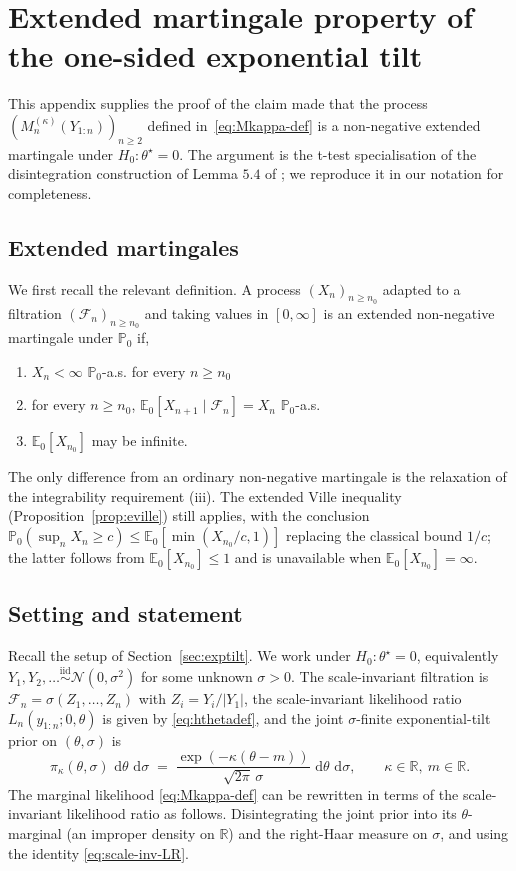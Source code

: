 \documentclass[12pt, a4paper]{report}
\newcommand{\E}{\mathbb{E}}
\newcommand{\dd}{\,\mathrm{d}}
\newcommand{\1}{\mathbf{1}}
\begin{document}
\section{Extended martingale property of the one-sided exponential tilt}
\label{app:extended-mg}
This appendix supplies the proof of the claim made that the process \((M_n^{(\kappa)}(Y_{1:n}))_{n\geq 2}\) defined in~\eqref{eq:Mkappa-def} is a non-negative extended martingale under \(H_0:\theta^\star=0\). The
argument is the t-test specialisation of the disintegration construction of Lemma $5.4$ of \cite{Wang2025}; we reproduce it in our notation for completeness.

\subsection{Extended martingales}

We first recall the relevant definition. A process \((X_n)_{n\geq n_0}\)
adapted to a filtration \((\mathcal{F}_n)_{n\geq n_0}\) and taking values
in \([0,\infty]\) is an extended non-negative martingale under
\(\mathbb{P}_0\) if,
\begin{enumerate}
\item[(i)] \(X_n<\infty\) \(\mathbb{P}_0\)-a.s. for every \(n\geq n_0\)
\item[(ii)] for every \(n\geq n_0\),
\(\E_0[X_{n+1}\mid \mathcal{F}_n]=X_n\) \(\mathbb{P}_0\)-a.s.
\item[(iii)] \(\E_0[X_{n_0}]\) may be infinite.
\end{enumerate}
The only difference from an ordinary non-negative martingale is the
relaxation of the integrability requirement (iii). The extended Ville
inequality (Proposition~\ref{prop:eville}) still applies, with the conclusion \(\mathbb{P}_0(\sup_n X_n\geq c)\leq \E_0[\min(X_{n_0}/c,1)]\) replacing the classical bound \(1/c\); the latter follows from \(\E_0[X_{n_0}]\leq 1\) and is unavailable when \(\E_0[X_{n_0}]=\infty\).

\subsection{Setting and statement}

Recall the setup of Section~\ref{sec:exptilt}. We work under \(H_0:\theta^\star=0\),
equivalently \(Y_1,Y_2,\ldots\stackrel{\mathrm{iid}}{\sim}\mathcal{N}(0,\sigma^2)\)
for some unknown \(\sigma>0\). The scale-invariant filtration is
\(\mathcal{F}_n=\sigma(Z_1,\ldots,Z_n)\) with \(Z_i=Y_i/|Y_1|\), the
scale-invariant likelihood ratio \(L_n(y_{1:n};0,\theta)\) is given by
\eqref{eq:hthetadef}, and the joint \(\sigma\)-finite exponential-tilt prior on \((\theta,\sigma)\) is
\[
\pi_\kappa(\theta,\sigma)\,\dd\theta\,\dd\sigma
\;=\;\frac{\exp(-\kappa(\theta-m))}{\sqrt{2\pi}\,\sigma}\,
\dd\theta\,\dd\sigma,
\qquad \kappa\in\mathbb{R},\ m\in\mathbb{R}.
\]
The marginal likelihood \eqref{eq:Mkappa-def} can be rewritten in terms of the scale-invariant likelihood ratio as follows. Disintegrating the joint prior into its \(\theta\)-marginal (an improper density on \(\mathbb{R}\)) and the right-Haar measure on \(\sigma\), and using the identity \eqref{eq:scale-inv-LR}. 
\end{document}
